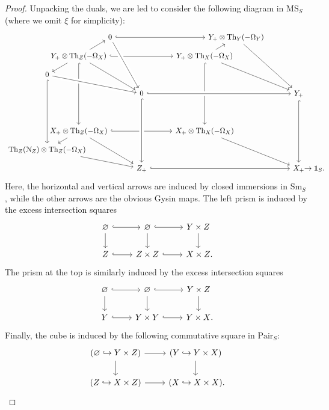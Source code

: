 \documentclass{amsart}
\numberwithin{equation}{section}
\theoremstyle{plain}
\theoremstyle{definition}
\let\scr=\mathcal
\def\1{\mathbf 1}
\let\into=\hookrightarrow
\let\emptyset=\varnothing
\def\Th{\mathrm{Th}}
\let\cat=\mathrm
\def\Sm{{\cat{S}\mathrm{m}}}
\def\MS{\mathrm{MS}}
\begin{document}
\begin{proof}
	Unpacking the duals, we are led to consider the following diagram in $\MS_S$ (where we omit $\xi$ for simplicity):
	\begin{equation}\label{eqn:big-3d-diagram}
	\begin{tikzcd}[row sep={25,between origins}, column sep={42,between origins}]
		& & 0 \ar[hook]{rrrr} && && Y_+\otimes \Th_Y(-\Omega_Y) \ar{dddr} \\
	 & Y_+\otimes \Th_Z(-\Omega_X) \ar[hook]{rrrr} \ar[hook]{dddd} \ar{ur} \ar{dl} && && Y_+\otimes \Th_X(-\Omega_X) \ar[hook]{dddd} \ar{ur} && \\
		0 \ar[hook]{dddd} \ar[crossing over]{drrr} \\
		& && 0 \ar[from=uuul,crossing over] \ar[crossing over,hook]{rrrr} \ar[from=uull,shorten >=2pt] && && Y_+ \ar[hook]{dddd} \ar[from=uull,shorten >=2pt] \\
		\\
		& X_+\otimes \Th_Z(-\Omega_X) \ar[hook]{rrrr} \ar{ddrr} \ar{dl} && &&  X_+\otimes \Th_X(-\Omega_X) \ar{ddrr} && \\
		\Th_Z(\scr N_Z)\otimes \Th_Z(-\Omega_X) \ar{drrr} \\
		& && Z_+ \ar[hook]{rrrr} \ar[from=uuuu,crossing over,hook] && && X_+\rlap{$\to \1_S$.}
	\end{tikzcd}
	\end{equation}
	Here, the horizontal and vertical arrows are induced by closed immersions in $\Sm_S$, while the other arrows are the obvious Gysin maps. 
	The left prism is induced by the excess intersection squares
	\[
	\begin{tikzcd}
		\emptyset \ar[hook]{r} \ar{d} & \emptyset \ar[hook]{r} \ar{d} & Y\times Z \ar{d} \\
		Z \ar[hook]{r} & Z\times Z \ar[hook]{r} & X\times Z\rlap.
	\end{tikzcd}
	\]
	The prism at the top is similarly induced by the excess intersection squares
	\[
	\begin{tikzcd}
		\emptyset \ar[hook]{r} \ar{d} & \emptyset \ar[hook]{r} \ar{d} & Y\times Z \ar{d} \\
		Y \ar[hook]{r} & Y\times Y \ar[hook]{r} & Y\times X\rlap.
	\end{tikzcd}
	\]
	Finally, the cube is induced by the following commutative square in $\mathrm{Pair}_S$:
	\[
	\begin{tikzcd}
		(\emptyset\into Y\times Z) \ar{r} \ar{d} & (Y\into Y\times X) \ar{d} \\
		(Z\into X\times Z) \ar{r} & (X\into X\times X)\rlap.

\end{tikzcd}\]
\end{proof}
\end{document}
